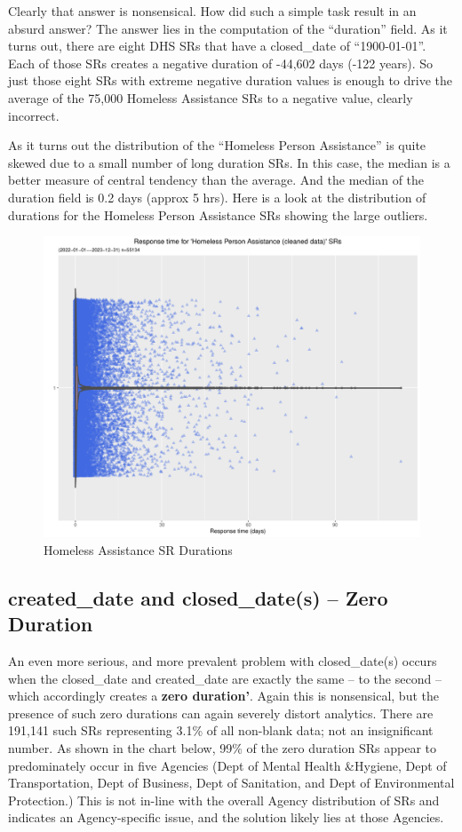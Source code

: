 \documentclass[12pt, titlepage]{article}
\begin{document}
{		Clearly that answer is nonsensical. How did such a simple task result in an absurd answer? The answer lies in the computation of the
		``duration'' field. As it turns out, there are eight DHS SRs that have a closed\_date of ``1900-01-01''. Each of those SRs creates a 
		negative duration of -44,602 days (-122 years). So just those eight SRs with extreme negative duration values is enough to drive
		the average of the 75,000 Homeless Assistance SRs to a negative value, clearly incorrect.
		
		As it turns out the distribution of the ``Homeless Person Assistance'' is quite skewed due to a small number of long duration
		SRs. In this case, the median is a better measure of central tendency than the average. And the median of the duration
		field is  0.2 days (approx 5 hrs). Here is a look at the distribution of durations for the Homeless Person Assistance SRs showing
		the large outliers. 
		
		\begin{figure}[H]
		 	 \centering
			  \includegraphics[width = \textwidth]{homeless_response_time_clean.pdf}
			  \caption{Homeless Assistance SR Durations}
			  \label{fig:homeless}
		\end{figure}
		
	\subsection{created\_date and closed\_date(s) --  Zero Duration}		
	An even more serious, and more prevalent problem with closed\_date(s) occurs when the closed\_date and created\_date
	are exactly the same -- to the second -- which accordingly creates a \textbf{zero duration'}. Again this is nonsensical, but the
	presence of such zero durations can again severely distort analytics. There are 191,141 such SRs representing 3.1\% of all 
	non-blank data; not an insignificant number. As shown in the chart below, 99\% of the zero duration SRs appear to predominately
	occur in five Agencies (Dept of Mental Health \&Hygiene, Dept of Transportation, Dept of Business, Dept of Sanitation,
	and Dept of Environmental Protection.) This is not in-line with the overall Agency distribution of SRs and indicates an
	Agency-specific issue, and the solution likely lies at those Agencies.
	
}
\end{document}
